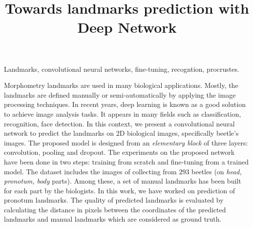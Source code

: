 \documentclass[10pt]{article}
\begin{document}
\noindent



\title{Towards landmarks prediction with Deep Network}




\maketitle

\keywords
Landmarks, convolutional neural networks, fine-tuning, recogntion, procrustes.

\abstract
Morphometry landmarks are used in many biological
applications. Mostly, the landmarks are defined manually or
semi-automatically by applying the image processing techniques. In recent
years, deep learning is known as a good solution to achieve image analysis tasks. It appears in many fields such as
classification, recognition, face detection. In this context, we
present a convolutional neural network to predict the landmarks on 2D
biological images, specifically beetle's images. The proposed model is designed from an \textit{elementary block} of three layers: convolution, pooling and dropout. The experiments on the
proposed network have been done in two steps: training from scratch and
fine-tuning from a trained model. The dataset includes the images of 
collecting from $293$ beetles (on \textit{head, pronotum, body} parts).
 Among these, a set of manual landmarks has been built for each part by 
the biologists. In this work, we have worked on prediction of pronotum landmarks. The quality of predicted landmarks
is evaluated by calculating the distance in pixels between the
coordinates of the predicted landmarks and manual landmarks which are
considered as ground truth.
\end{document}

